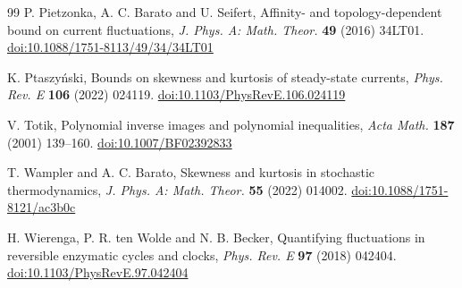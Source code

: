 \documentclass[11pt]{article}
\theoremstyle{remark}
\begin{document}
\begin{thebibliography}{99}
 P. Pietzonka, A. C. Barato and U. Seifert, Affinity- and
topology-dependent bound on current fluctuations, \emph{J. Phys. A: Math.
Theor.} \textbf{49} (2016) 34LT01.
\href{https://doi.org/10.1088/1751-8113/49/34/34LT01}{doi:10.1088/1751-8113/49/34/34LT01}

 K. Ptaszy\'nski, Bounds on skewness and kurtosis of
steady-state currents, \emph{Phys. Rev. E} \textbf{106} (2022) 024119.
\href{https://doi.org/10.1103/PhysRevE.106.024119}{doi:10.1103/PhysRevE.106.024119}

 V. Totik, Polynomial inverse images and polynomial
inequalities, \emph{Acta Math.} \textbf{187} (2001) 139--160.
\href{https://doi.org/10.1007/BF02392833}{doi:10.1007/BF02392833}

 T. Wampler and A. C. Barato, Skewness and kurtosis in
stochastic thermodynamics, \emph{J. Phys. A: Math. Theor.} \textbf{55}
(2022) 014002.
\href{https://doi.org/10.1088/1751-8121/ac3b0c}{doi:10.1088/1751-8121/ac3b0c}

 H. Wierenga, P. R. ten Wolde and N. B. Becker,
Quantifying fluctuations in reversible enzymatic cycles and clocks,
\emph{Phys. Rev. E} \textbf{97} (2018) 042404.
\href{https://doi.org/10.1103/PhysRevE.97.042404}{doi:10.1103/PhysRevE.97.042404}

\end{thebibliography}
\end{document}
